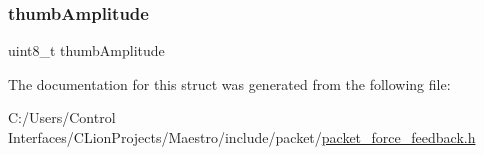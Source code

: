 \mbox{\label{struct_haptic_motor_amplitude_update_ad8b27777752714df0f39bf998079db76}} 
\subsubsection{\texorpdfstring{thumb\+Amplitude}{thumbAmplitude}}
{\footnotesize\ttfamily uint8\+\_\+t thumb\+Amplitude}



The documentation for this struct was generated from the following file\+:\begin{DoxyCompactItemize}
\item 
C\+:/\+Users/\+Control Interfaces/\+C\+Lion\+Projects/\+Maestro/include/packet/\hyperlink{packet__force__feedback_8h}{packet\+\_\+force\+\_\+feedback.\+h}\end{DoxyCompactItemize}
